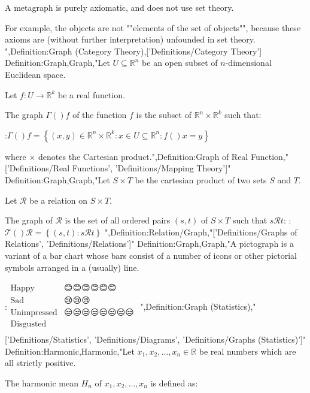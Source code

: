 A metagraph is purely axiomatic, and does not use set theory.

For example, the objects are not ""elements of the set of objects"", because these axioms are (without further interpretation) unfounded in set theory.
",Definition:Graph (Category Theory),['Definitions/Category Theory']
Definition:Graph,Graph,"Let $U \subseteq \mathbb R^n$ be an open subset of $n$-dimensional Euclidean space.

Let $f : U \to \mathbb R^k$ be a real function.


The graph $\Gamma \left(   \right)f$ of the function $f$ is the subset of $\mathbb R^n \times \mathbb R^k$ such that:

:$\Gamma \left(   \right)f = \left\lbrace \left( x, y \right) \in \mathbb R^n \times \mathbb R^k: x \in U \subseteq \mathbb R^n : f \left(   \right)x = y \right\rbrace$

where $\times$ denotes the Cartesian product.",Definition:Graph of Real Function,"['Definitions/Real Functions', 'Definitions/Mapping Theory']"
Definition:Graph,Graph,"Let $S \times T$ be the cartesian product of two sets $S$ and $T$.

Let $\mathcal R$ be a relation on $S \times T$.


The graph of $\mathcal R$ is the set of all ordered pairs $\left( s, t \right)$ of $S \times T$ such that $s \mathrel \mathcal R t$:
:$\mathcal T \left(   \right)\mathcal R = \left\lbrace \left( s, t \right): s \mathrel \mathcal R t \right\rbrace$
",Definition:Relation/Graph,"['Definitions/Graphs of Relations', 'Definitions/Relations']"
Definition:Graph,Graph,"A pictograph is a variant of a bar chart whose  bars consist of a number of icons or other pictorial symbols arranged in a (usually) line.


:$\begin {array} {r|l} \text {Happy} & 😊😊😊😊😊😊 \\ \text {Sad} & 😢😢😢 \\ \text {Unimpressed} & 😒😒😒😒😒😒😒😒 \\ \text {Disgusted} & 🤢🤢🤢🤢 \\ \end {array}$
",Definition:Graph (Statistics),"['Definitions/Statistics', 'Definitions/Diagrams', 'Definitions/Graphs (Statistics)']"
Definition:Harmonic,Harmonic,"Let $x_1, x_2, \ldots, x_n \in \mathbb R$ be real numbers which are all strictly positive.

The harmonic mean $H_n$ of $x_1, x_2, \ldots, x_n$ is defined as:

